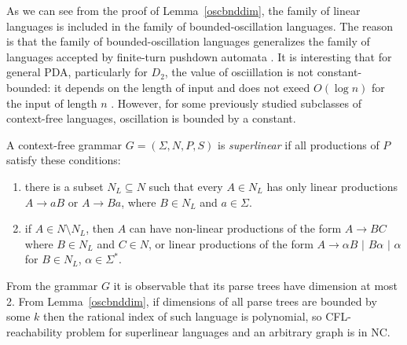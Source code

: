 As we can see from the proof of Lemma~\ref{oscbnddim}, the family of linear languages is included in the family of bounded-oscillation languages. The reason is that the family of bounded-oscillation languages generalizes the family of languages accepted by finite-turn pushdown automata \cite{BoundOsc}. It is interesting that for general PDA, particularly for $D_2$, the value of osciillation is not constant-bounded: it depends on the length of input and does not exeed $O(\log n)$ for the input of length $n$ \cite*{Gundermann, Wechsung}. However, for some previously studied subclasses of context-free languages,  oscillation is bounded by a constant.

\begin{example} A context-free grammar $G = (\Sigma, N, P, S)$ is \textit{superlinear} if all productions of $P$ satisfy these conditions:
\begin{enumerate}
\item there is a subset $N_L \subseteq N$ such that every $A \in N_L$ has only linear productions $A\rightarrow aB$ or $A\rightarrow Ba$, where $B \in N_L$ and $a \in \Sigma$.
\item if $A \in N \setminus N_L$, then $A$ can have non-linear productions of the form $A \rightarrow BC$ where $B\in N_L$ and $C \in N$, or linear productions of the form $A\rightarrow \alpha B$ $\vert$ $B \alpha$ $\vert$ $\alpha$ for $B \in N_L$, $\alpha \in \Sigma^*$.
\end{enumerate}
From the grammar $G$ it is observable that its parse trees have dimension at most 2. From 
Lemma~\ref{oscbnddim}, if dimensions of all parse trees are bounded by some $k$ then the rational index of such language is polynomial, so CFL-reachability problem for superlinear languages and an arbitrary graph is in NC. 
\end{example}